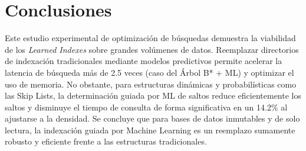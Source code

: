 \documentclass[twocolumn,10pt,journal]{IEEEtran}
\begin{document}
\section{Conclusiones}
Este estudio experimental de optimizaci\'on de b\'usquedas demuestra la viabilidad de los \textit{Learned Indexes} sobre grandes vol\'umenes de datos. Reemplazar directorios de indexaci\'on tradicionales mediante modelos predictivos permite acelerar la latencia de b\'usqueda m\'as de 2.5 veces (caso del Árbol B* + ML) y optimizar el uso de memoria. No obstante, para estructuras din\'amicas y probabil\'isticas como las Skip Lists, la determinaci\'on guiada por ML de saltos reduce eficientemente los saltos y disminuye el tiempo de consulta de forma significativa en un 14.2\% al ajustarse a la densidad. Se concluye que para bases de datos inmutables y de solo lectura, la indexación guiada por Machine Learning es un reemplazo sumamente robusto y eficiente frente a las estructuras tradicionales.



\end{document}
